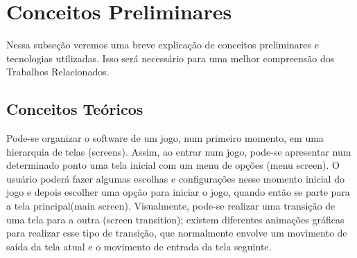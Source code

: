 \chapter{Conceitos Preliminares}
\label{FundamentacaoTeorica}




Nessa subseção veremos uma  breve explicação de conceitos preliminares e tecnologias utilizadas. Isso será necessário para uma melhor compreensão dos Trabalhos Relacionados. 


\section{ Conceitos Teóricos }
Pode-se organizar o software de um jogo, num primeiro momento, em uma hierarquia de telas (screens). Assim, ao entrar num jogo, pode-se apresentar num determinado ponto uma tela inicial com um menu de opções (menu screen). O usuário poderá fazer algumas escolhas e configurações nesse momento inicial do jogo e depois escolher uma opção para iniciar o jogo, quando então se parte para a tela principal(main screen). Visualmente, pode-se realizar uma transição de uma tela para a outra (screen transition); existem diferentes animações gráficas para realizar esse tipo de transição, que normalmente envolve um movimento de saída da tela atual e o movimento de entrada da tela seguinte.

